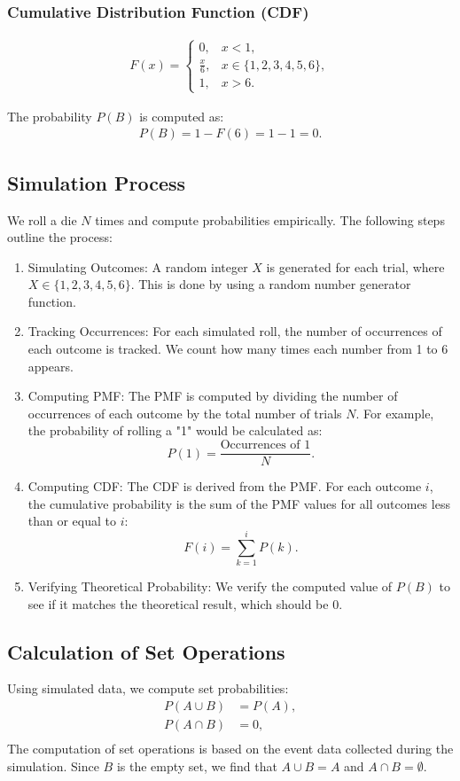 \documentclass[journal]{IEEEtran}
\begin{document}
\subsubsection*{Cumulative Distribution Function (CDF)}
\begin{align}
F(x) = \begin{cases} 
0, & x < 1, \\
\frac{x}{6}, & x \in \{1,2,3,4,5,6\}, \\
1, & x > 6.
\end{cases}
\end{align}

The probability \( P(B) \) is computed as:
\begin{align}
    P(B) = 1 - F(6) = 1 - 1 = 0.
\end{align}

\subsection*{Simulation Process}
We roll a die \( N \) times and compute probabilities empirically. The following steps outline the process:
\begin{enumerate}
    \item Simulating Outcomes: A random integer \( X \) is generated for each trial, where \( X \in \{1, 2, 3, 4, 5, 6\} \). This is done by using a random number generator function.
    \item Tracking Occurrences: For each simulated roll, the number of occurrences of each outcome is tracked. We count how many times each number from 1 to 6 appears.
    \item Computing PMF: The PMF is computed by dividing the number of occurrences of each outcome by the total number of trials \( N \). For example, the probability of rolling a "1" would be calculated as:
    \[
    P(1) = \frac{\text{Occurrences of 1}}{N}.
    \]
    \item Computing CDF: The CDF is derived from the PMF. For each outcome \( i \), the cumulative probability is the sum of the PMF values for all outcomes less than or equal to \( i \):
    \[
    F(i) = \sum_{k=1}^{i} P(k).
    \]
    \item Verifying Theoretical Probability: We verify the computed value of \( P(B) \) to see if it matches the theoretical result, which should be 0.
\end{enumerate}

\subsection*{Calculation of Set Operations}
Using simulated data, we compute set probabilities:
\begin{align}
    P(A \cup B) &= P(A), \\
    P(A \cap B) &= 0, \\
\end{align}
The computation of set operations is based on the event data collected during the simulation. Since \( B \) is the empty set, we find that \( A \cup B = A \) and \( A \cap B = \emptyset \).
\end{document}
